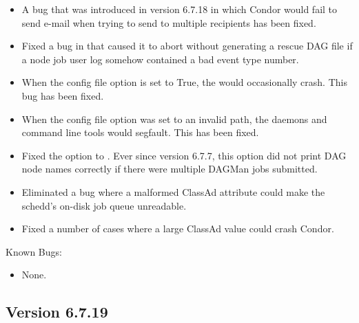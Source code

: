 \begin{itemize}
\item A bug that was introduced in version 6.7.18 in which Condor
would fail to send e-mail when trying to send to multiple recipients
has been fixed.

\item Fixed a bug in  that caused it to abort without
generating a rescue DAG file if a node job user log somehow contained
a bad event type number.

\item When the  config file option
is set to True, the  would occasionally crash. This bug
has been fixed.

\item When the  config file option was set to
an invalid path, the daemons and command line tools would segfault. This
has been fixed.

\item Fixed the  option to .  Ever since version 6.7.7,
this option did not print DAG node names correctly if there were multiple
DAGMan jobs submitted.

\item Eliminated a bug where a malformed ClassAd attribute could make the
schedd's on-disk job queue unreadable.

\item Fixed a number of cases where a large ClassAd value could crash Condor.

\end{itemize}

\noindent Known Bugs:

\begin{itemize}

\item None.

\end{itemize}




\subsection*{\label{sec:New-6-7-19}Version 6.7.19}

